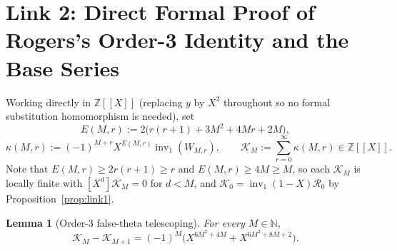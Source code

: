 \documentclass[11pt]{article}
\newcommand{\llbracket}{[\![}
\newcommand{\rrbracket}{]\!]}
\newtheorem{lemma}[theorem]{Lemma}
\theoremstyle{definition}
\newcommand{\N}{\mathbb{N}}
\newcommand{\Z}{\mathbb{Z}}
\newcommand{\inv}{\operatorname{inv}_1}
\begin{document}
\section{Link 2: Direct Formal Proof of Rogers's Order-3 Identity and the Base Series}

Working directly in $\Z\llbracket X \rrbracket$ (replacing $y$ by $X^2$ throughout so no formal substitution homomorphism is needed), set
\[
E(M, r) := 2\bigl(r(r + 1) + 3M^2 + 4Mr + 2M\bigr),
\]
\[
\kappa(M, r) := (-1)^{M+r} X^{E(M, r)} \inv(W_{M, r}), \qquad
\mathcal{K}_M := \sum_{r=0}^{\infty} \kappa(M, r) \in \Z\llbracket X \rrbracket.
\]
Note that $E(M, r) \ge 2r(r + 1) \ge r$ and $E(M, r) \ge 4M \ge M$, so each $\mathcal{K}_M$ is locally finite with $[X^d] \mathcal{K}_M = 0$ for $d < M$, and $\mathcal{K}_0 = \inv(1 - X)\mathcal{R}_0$ by Proposition~\ref{prop:link1}.

\begin{lemma}[Order-$3$ false-theta telescoping]
\label{lem:link2-step}
For every $M \in \N$,
\begin{equation}
\label{eq:k-diff}
\mathcal{K}_M - \mathcal{K}_{M+1} = (-1)^M \bigl(X^{6M^2 + 4M} + X^{6M^2 + 8M + 2}\bigr).
\end{equation}
\end{lemma}
\end{document}
